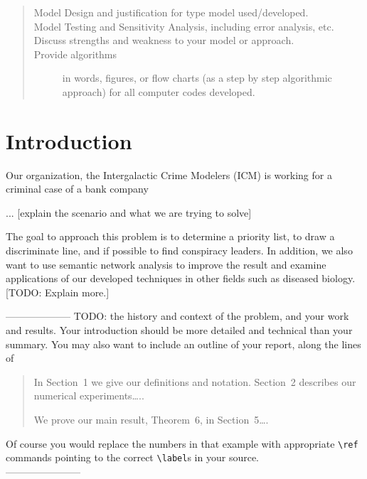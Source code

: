 \documentclass{icmmcm}
\begin{document}
\begin{summary}
\begin{quotation}
\begin{description}
\item[Model Design and justification for type model used/developed.]

\item[Model Testing and Sensitivity Analysis, including error
  analysis, etc.]

\item[Discuss strengths and weakness to your model or approach.]

\item[Provide algorithms] in words, figures, or flow charts (as a step
  by step algorithmic approach) for all computer codes developed.
\end{description}
 \citep{comap-mcm-rules}
\end{quotation}

\end{summary}
 


\maketitle
\tableofcontents

\listoffigures
\listoftables  
 

\section{Introduction}%
\label{sec:introduction}


Our organization, the Intergalactic Crime Modelers (ICM) is working
for a criminal case of a bank company

... [explain the scenario and what we are trying to solve]

The goal to approach this problem is to determine a priority list, 
to draw a discriminate line, and if possible to find
conspiracy leaders. In addition, we also want to use semantic
network analysis to improve the result and examine applications of
our developed techniques in other fields such as diseased biology.
[TODO: Explain more.]

\noindent -------------------- TODO:
the history and context of the problem,
and your work and results.  Your introduction should be more detailed
and technical than your summary.  You may also want to include an
outline of your report, along the lines of
\begin{quotation}
  In Section~1 we give our definitions and notation. Section~2
  describes our numerical experiments\ldots{}..
  
  We prove our main result, Theorem~6, in Section~5\ldots{}.
\end{quotation}
Of course you would replace the numbers in that example with
appropriate \verb|\ref| commands pointing to the correct
\verb|\label|s in your source.\\
-----------------------
\end{document}
